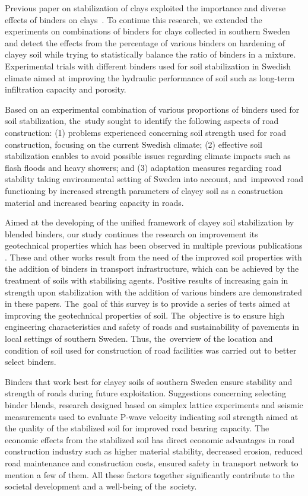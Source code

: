 \documentclass[constrmater,article,accept,pdftex,moreauthors]{Definitions/mdpi}
\begin{document}
{Previous} paper on stabilization of clays{ }exploited the importance and diverse effects of binders on clays~\cite{Okagbue,Estabragh,Xu}. {To continue this research}, we {extended the experiments on combinations of binders} for clays collected in southern Sweden and detect the effects from the percentage of various binders on hardening of clayey soil while trying to statistically balance the ratio of binders in a mixture. {Experimental trials with different binders used for soil stabilization in Swedish climate aimed at improving the hydraulic performance of soil such as long-term infiltration capacity and porosity.}

{Based on an experimental combination of various proportions of binders used for soil stabilization, the~study sought to identify the following aspects of road construction: (1) problems experienced concerning soil strength used for road construction, focusing on the current Swedish climate; (2) effective soil stabilization enables to avoid possible issues regarding climate impacts such as flash floods and heavy showers; and (3) adaptation measures regarding road stability taking environmental setting of Sweden into account, and~improved road functioning by increased strength parameters of clayey soil as a construction material and increased bearing capacity in roads.}

Aimed at {the }developing {of the} unified{ }framework of clayey soil stabilization by blended binders, our study continues the research on improvement its geotechnical properties which has been observed in multiple previous publications \citep{Sorengard,AlSwaidani,Feng,LindhLemenkovaECES,Maheepala,Lindh2022NL,Nordmark}. These and other works result from the need of the improved soil properties with the addition of binders in transport infrastructure, which can be achieved by the treatment of soils with stabilising agents. Positive results of increasing gain in strength upon stabilization with the addition of various binders are demonstrated in these papers. The~goal of this survey is to provide a series of tests aimed at improving the geotechnical properties of soil. The~objective is to ensure high engineering characteristics and safety of roads and sustainability of pavements{ in local settings of southern Sweden. Thus, the~overview of the location and condition of soil used for construction of road facilities was carried out to better select binders.} 

{Binders that work best for clayey soils of southern Sweden ensure stability and strength of roads during future exploitation. Suggestions concerning selecting binder blends, research designed based on simplex lattice experiments and seismic measurements used to evaluate P-wave velocity indicating soil strength aimed at the quality of the stabilized soil for improved road bearing capacity. }The economic effects from the stabilized soil has direct economic advantages in road construction industry such as higher material stability, decreased erosion, reduced road maintenance and construction costs, ensured safety in transport network to mention a few of them. All these factors together significantly contribute to the societal development and a well-being of the~society.
\end{document}

